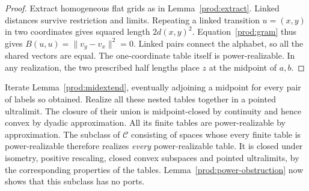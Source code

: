 \begin{proof}
Extract homogeneous flat grids as in Lemma~\ref{prod:extract}. Linked
distances survive restriction and limits. Repeating a linked transition
$u=(x,y)$ in two coordinates gives squared length $2d(x,y)^2$.
Equation~\eqref{prod:gram} thus gives $B(u,u)=\|v_y-v_x\|^2=0$.
Linked pairs connect the alphabet, so all the shared vectors are equal.
The one-coordinate table itself is power-realizable. In any realization,
the two prescribed half lengths place $z$ at the midpoint of $a,b$.
\end{proof}

Iterate Lemma~\ref{prod:midextend}, eventually adjoining a midpoint
for every pair of labels so obtained. Realize all these nested tables
together in a pointed ultralimit. The closure of their union is
midpoint-closed by continuity and hence convex by dyadic approximation.
All its finite tables are power-realizable by approximation. The
subclass of $\mathcal C$ consisting of spaces whose every finite table
is power-realizable therefore realizes \emph{every} power-realizable
table. It is closed under isometry, positive rescaling, closed convex
subspaces and pointed ultralimits, by the corresponding properties of
the tables. Lemma~\ref{prod:power-obstruction} now shows that this
subclass has no ports.

